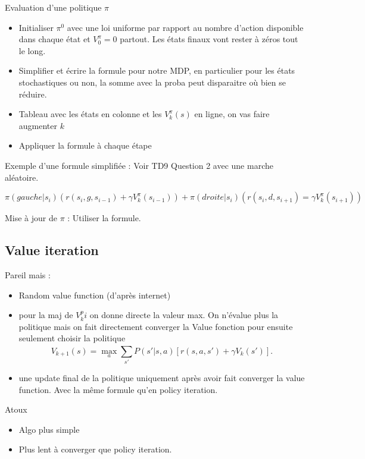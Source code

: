 \documentclass{article}
\begin{document}
Evaluation d'une politique $ \pi $ 
\begin{itemize}
    \item Initialiser $ \pi ^0 $ avec une loi uniforme par rapport au nombre d'action disponible dans chaque état et $ V^\pi _0 = 0 $ partout. Les états finaux vont rester à zéros tout le long.
    \item Simplifier et écrire la formule pour notre MDP, en particulier pour les états stochastiques ou non, la somme avec la proba peut disparaitre où bien se réduire.
    \item Tableau avec les états en colonne et les $ V^\pi_k (s) $ en ligne, on vas faire augmenter $ k $ 
    \item Appliquer la formule à chaque étape
\end{itemize}
Exemple d'une formule simplifiée : Voir TD9 Question 2 avec une marche aléatoire. 
  
 \[  
   \pi (gauche | s_i) (r(s_i, g, s_{i-1}) + \gamma V_k^\pi (s_{i-1}))  + \pi (droite | s_i) (r(s_i, d, s_{i+1}) = \gamma V_k^\pi (s_{i+1}))\]

Mise à jour de $ \pi $ : Utiliser la formule.

\subsection{Value iteration}
Pareil mais :\begin{itemize}
    \item Random value function (d'après internet)
    \item pour la maj de $ V_k^pi $ on donne directe la valeur max. On n'évalue plus la politique mais on fait directement converger la Value fonction pour ensuite seulement choisir la politique
    \[
        V_{k+1}(s) = \max _a \sum_{s'}^{}P(s'|s, a)[r(s,a,s') + \gamma V_k (s')]
    .\]
    \item une update final de la politique uniquement après avoir fait converger la value function. Avec la même formule qu'en policy iteration.
\end{itemize}
Atoux \begin{itemize}
    \item Algo plus simple
    \item Plus lent à converger que policy iteration.
\end{itemize}

\end{document}

